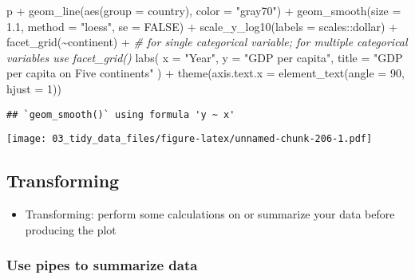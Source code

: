 \documentclass[
]{book}
\newenvironment{Shaded}{\begin{snugshade}}{\end{snugshade}}
\newcommand{\AttributeTok}[1]{\textcolor[rgb]{0.77,0.63,0.00}{#1}}
\newcommand{\CommentTok}[1]{\textcolor[rgb]{0.56,0.35,0.01}{\textit{#1}}}
\newcommand{\ConstantTok}[1]{\textcolor[rgb]{0.00,0.00,0.00}{#1}}
\newcommand{\DecValTok}[1]{\textcolor[rgb]{0.00,0.00,0.81}{#1}}
\newcommand{\FloatTok}[1]{\textcolor[rgb]{0.00,0.00,0.81}{#1}}
\newcommand{\FunctionTok}[1]{\textcolor[rgb]{0.00,0.00,0.00}{#1}}
\newcommand{\NormalTok}[1]{#1}
\newcommand{\SpecialCharTok}[1]{\textcolor[rgb]{0.00,0.00,0.00}{#1}}
\newcommand{\StringTok}[1]{\textcolor[rgb]{0.31,0.60,0.02}{#1}}
\providecommand{\tightlist}{%
  \setlength{\itemsep}{0pt}\setlength{\parskip}{0pt}}
\begin{document}
\begin{Shaded}
\begin{Highlighting}[]
\NormalTok{p }\SpecialCharTok{+} \FunctionTok{geom\_line}\NormalTok{(}\FunctionTok{aes}\NormalTok{(}\AttributeTok{group =}\NormalTok{ country), }\AttributeTok{color =} \StringTok{"gray70"}\NormalTok{) }\SpecialCharTok{+}
  \FunctionTok{geom\_smooth}\NormalTok{(}\AttributeTok{size =} \FloatTok{1.1}\NormalTok{, }\AttributeTok{method =} \StringTok{"loess"}\NormalTok{, }\AttributeTok{se =} \ConstantTok{FALSE}\NormalTok{) }\SpecialCharTok{+}
  \FunctionTok{scale\_y\_log10}\NormalTok{(}\AttributeTok{labels =}\NormalTok{ scales}\SpecialCharTok{::}\NormalTok{dollar) }\SpecialCharTok{+}
  \FunctionTok{facet\_grid}\NormalTok{(}\SpecialCharTok{\textasciitilde{}}\NormalTok{continent) }\SpecialCharTok{+} \CommentTok{\# for single categorical variable; for multiple categorical variables use facet\_grid()}
  \FunctionTok{labs}\NormalTok{(}
    \AttributeTok{x =} \StringTok{"Year"}\NormalTok{,}
    \AttributeTok{y =} \StringTok{"GDP per capita"}\NormalTok{,}
    \AttributeTok{title =} \StringTok{"GDP per capita on Five continents"}
\NormalTok{  ) }\SpecialCharTok{+}
  \FunctionTok{theme}\NormalTok{(}\AttributeTok{axis.text.x =} \FunctionTok{element\_text}\NormalTok{(}\AttributeTok{angle =} \DecValTok{90}\NormalTok{, }\AttributeTok{hjust =} \DecValTok{1}\NormalTok{))}
\end{Highlighting}
\end{Shaded}

\begin{verbatim}
## `geom_smooth()` using formula 'y ~ x'
\end{verbatim}

\texttt{[image: 03\_tidy\_data\_files/figure-latex/unnamed-chunk-206-1.pdf]}

\hypertarget{transforming}{%
\subsection{Transforming}\label{transforming}}

\begin{itemize}
\tightlist
\item
  Transforming: perform some calculations on or summarize your data before producing the plot
\end{itemize}

\hypertarget{use-pipes-to-summarize-data}{%
\subsubsection{Use pipes to summarize data}\label{use-pipes-to-summarize-data}}
\end{document}
